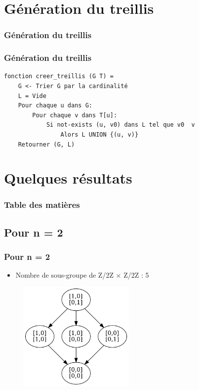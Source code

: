 \documentclass{beamer}
\begin{document}
\section{Génération du treillis}
\begin{frame}
\frametitle{Génération du treillis}
\tableofcontents[currentsection]
\end{frame}

\begin{frame}[fragile]
\frametitle{Génération du treillis}
\begin{verbatim}
fonction creer_treillis (G T) =
    G <- Trier G par la cardinalité
    L = Vide
    Pour chaque u dans G:
        Pour chaque v dans T[u]:
            Si not-exists (u, v0) dans L tel que v0  v
                Alors L UNION {(u, v)}
    Retourner (G, L)
\end{verbatim}
\end{frame}


\section{Quelques résultats}
\begin{frame}
\frametitle{Table des matières}
\tableofcontents[currentsection]
\end{frame}


\subsection{Pour n = 2}
\begin{frame}
\frametitle{Pour n = 2}
\begin{itemize}
    \item Nombre de sous-groupe de Z/2Z × Z/2Z : 5
\end{itemize}
\begin{figure}
  \centering
  \includegraphics[width=0.5\textwidth]{Z2ZxZ2Z.png}
\end{figure}
\end{frame}
\end{document}
